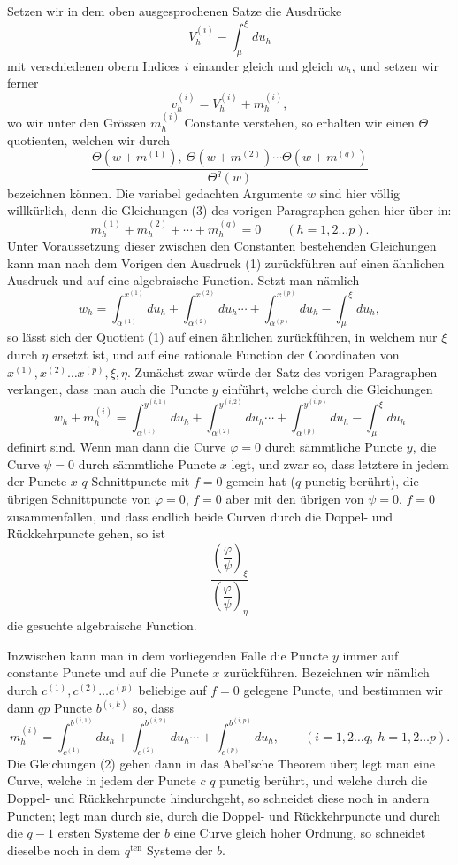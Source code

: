 \documentclass[10pt]{article}
\begin{document}
Setzen wir in dem oben ausgesprochenen Satze die Ausdrücke
\[
V_h^{(i)}-\int_{\mu}^{\xi}du_h
\]
mit verschiedenen obern Indices \(i\) einander gleich und gleich \(w_h\), und setzen wir ferner
\[
v_h^{(i)}=V_h^{(i)}+m_h^{(i)},
\]
wo wir unter den Grössen \(m_h^{(i)}\) Constante verstehen, so erhalten wir einen \(\Theta\)quotienten, welchen wir durch
\[
\tag{1}
\frac{\Theta(w+m^{(1)}),\ \Theta(w+m^{(2)})\cdots\Theta(w+m^{(q)})}{\Theta^{q}(w)}
\]
bezeichnen können. Die variabel gedachten Argumente \(w\) sind hier völlig willkürlich, denn die Gleichungen (3) des vorigen Paragraphen gehen hier über in:
\[
\tag{2}
m_h^{(1)}+m_h^{(2)}+\cdots+m_h^{(q)}=0
\qquad(h=1,2\ldots p).
\]
Unter Voraussetzung dieser zwischen den Constanten bestehenden Gleichungen kann man nach dem Vorigen den Ausdruck (1) zurückführen auf einen ähnlichen Ausdruck und auf eine algebraische Function. Setzt man nämlich
\[
\tag{3}
w_h=\int_{\alpha^{(1)}}^{x^{(1)}}du_h+
\int_{\alpha^{(2)}}^{x^{(2)}}du_h\cdots+
\int_{\alpha^{(p)}}^{x^{(p)}}du_h-
\int_{\mu}^{\xi}du_h,
\]
so lässt sich der Quotient (1) auf einen ähnlichen zurückführen, in welchem nur \(\xi\) durch \(\eta\) ersetzt ist, und auf eine rationale Function der Coordinaten von \(x^{(1)},x^{(2)}\ldots x^{(p)},\xi,\eta\). Zunächst zwar würde der Satz des vorigen Paragraphen verlangen, dass man auch die Puncte \(y\) einführt, welche durch die Gleichungen
\[
\tag{4}
w_h+m_h^{(i)}=\int_{\alpha^{(1)}}^{y^{(i,1)}}du_h+
\int_{\alpha^{(2)}}^{y^{(i,2)}}du_h\cdots+
\int_{\alpha^{(p)}}^{y^{(i,p)}}du_h-
\int_{\mu}^{\xi}du_h
\]
definirt sind. Wenn man dann die Curve \(\varphi=0\) durch sämmtliche Puncte \(y\), die Curve \(\psi=0\) durch sämmtliche Puncte \(x\) legt, und zwar so, dass letztere in jedem der Puncte \(x\) \(q\) Schnittpuncte mit \(f=0\) gemein hat (\(q\) punctig berührt), die übrigen Schnittpuncte von \(\varphi=0\), \(f=0\) aber mit den übrigen von \(\psi=0\), \(f=0\) zusammenfallen, und dass endlich beide Curven durch die Doppel- und Rückkehrpuncte gehen, so ist
\[
\frac{\left(\dfrac{\varphi}{\psi}\right)_{\xi}}
     {\left(\dfrac{\varphi}{\psi}\right)_{\eta}}
\]
die gesuchte algebraische Function.

Inzwischen kann man in dem vorliegenden Falle die Puncte \(y\) immer auf constante Puncte und auf die Puncte \(x\) zurückführen. Bezeichnen wir nämlich durch \(c^{(1)},c^{(2)}\ldots c^{(p)}\) beliebige auf \(f=0\) gelegene Puncte, und bestimmen wir dann \(q p\) Puncte \(b^{(i,k)}\) so, dass
\[
\tag{5}
m_h^{(i)}=\int_{c^{(1)}}^{b^{(i,1)}}du_h+
\int_{c^{(2)}}^{b^{(i,2)}}du_h\cdots+
\int_{c^{(p)}}^{b^{(i,p)}}du_h,
\qquad (i=1,2\ldots q,\ h=1,2\ldots p).
\]
Die Gleichungen (2) gehen dann in das Abel'sche Theorem über; legt man eine Curve, welche in jedem der Puncte \(c\) \(q\) punctig berührt, und welche durch die Doppel- und Rückkehrpuncte hindurchgeht, so schneidet diese noch in andern Puncten; legt man durch sie, durch die Doppel- und Rückkehrpuncte und durch die \(q-1\) ersten Systeme der \(b\) eine Curve gleich hoher Ordnung, so schneidet dieselbe noch in dem \(q^{\mathrm{ten}}\) Systeme der \(b\).
\end{document}
